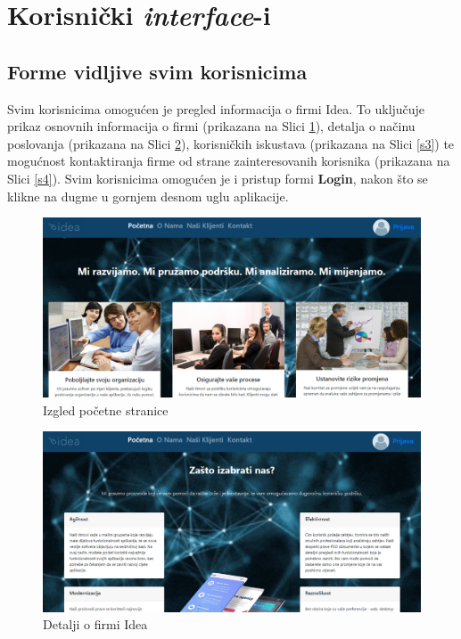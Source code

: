 \documentclass[12pt,a4paper]{article}
\begin{document}
\newpage

\section{Korisnički \textit{interface}-i}

\subsection{Forme vidljive svim korisnicima}

Svim korisnicima omogućen je pregled informacija o firmi Idea. To uključuje prikaz osnovnih informacija o firmi (prikazana na Slici \ref{s1}), detalja o načinu poslovanja (prikazana na Slici \ref{s2}), korisničkih iskustava (prikazana na Slici \ref{s3}) te mogućnost kontaktiranja firme od strane zainteresovanih korisnika (prikazana na Slici \ref{s4}). Svim korisnicima omogućen je i pristup formi \textbf{Login}, nakon što se klikne na dugme u gornjem desnom uglu aplikacije.

\begin{figure}[H]
\center
\includegraphics[scale=0.35]{../res/UI/home.PNG}
\caption{Izgled početne stranice}
\label{s1}
\end{figure}

\begin{figure}[H]
\center
\includegraphics[scale=0.35]{../res/UI/about.PNG}
\caption{Detalji o firmi Idea}
\label{s2}
\end{figure}
\end{document}
